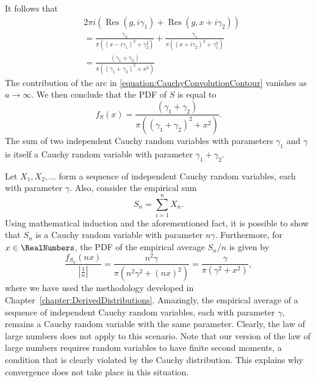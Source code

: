 It follows that
\begin{equation*}
\begin{split}
& 2 \pi i \left( \operatorname{Res} (g, i \gamma_1)
+ \operatorname{Res} (g, x + i \gamma_2) \right) \\
&= \frac{\gamma_2}{\pi \left( ( x - i \gamma_1 )^2 + \gamma_2^2 \right) }
+ \frac{\gamma_1}{\pi \left( ( x + i \gamma_2 )^2 + \gamma_1^2 \right) } \\
&= \frac{(\gamma_1 + \gamma_2)}
{\pi \left( (\gamma_1 + \gamma_2)^2 + x^2 \right) }
\end{split}
\end{equation*}
The contribution of the arc in \eqref{equation:CauchyConvolutionContour} vanishes as $a \rightarrow \infty$.
We then conclude that the PDF of $S$ is equal to
\begin{equation*}
f_S (x) = \frac{(\gamma_1 + \gamma_2)}
{\pi \left( (\gamma_1 + \gamma_2)^2 + x^2 \right) } .
\end{equation*}
The sum of two independent Cauchy random variables with parameters $\gamma_1$ and $\gamma$ is itself a Cauchy random variable with parameter $\gamma_1 + \gamma_2$.

Let $X_1, X_2, \ldots$ form a sequence of independent Cauchy random variables, each with parameter $\gamma$.
Also, consider the empirical sum
\begin{equation*}
S_n = \sum_{i=1}^n X_n .
\end{equation*}
Using mathematical induction and the aforementioned fact, it is possible to show that $S_n$ is a Cauchy random variable with parameter $n \gamma$.
Furthermore, for $x \in \RealNumbers$, the PDF of the empirical average $S_n / n$ is given by
\begin{equation*}
\frac{f_{S_n} ( n x )}{\left| \frac{1}{n} \right|}
= \frac{n^2 \gamma}{\pi \left( n^2 \gamma^2 + (nx)^2 \right)}
= \frac{\gamma}{\pi \left( \gamma^2 + x^2 \right)} ,
\end{equation*}
where we have used the methodology developed in Chapter~\ref{chapter:DerivedDistributions}.
Amazingly, the empirical average of a sequence of independent Cauchy random variables, each with parameter $\gamma$, remains a Cauchy random variable with the same parameter.
Clearly, the law of large numbers does not apply to this scenario.
Note that our version of the law of large numbers requires random variables to have finite second moments, a condition that is clearly violated by the Cauchy distribution.
This explains why convergence does not take place in this situation.


